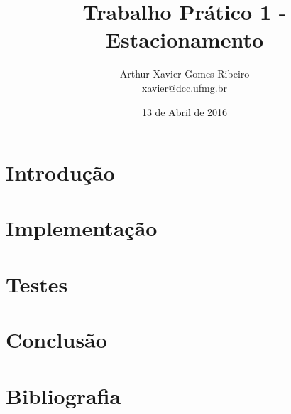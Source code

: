 \documentclass[a4paper,12pt]{article}
\title{Trabalho Prático 1 - Estacionamento}
\author{Arthur Xavier Gomes Ribeiro\\xavier@dcc.ufmg.br}
\date{13 de Abril de 2016}
\begin{document}
\maketitle

\section{Introdução}

\section{Implementação}

\section{Testes}

\section{Conclusão}

\section{Bibliografia}
\end{document}
